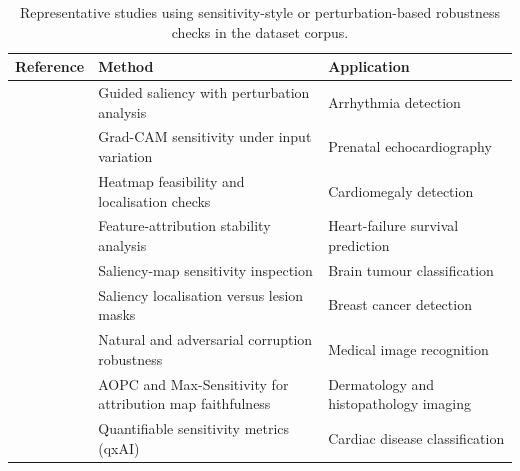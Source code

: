 \begin{table}[htbp]
\centering
\caption{Representative studies using sensitivity-style or perturbation-based robustness checks in the dataset corpus.}
\label{tab:sensitivity_methods}
\renewcommand{\arraystretch}{1.2}

\begin{tabular}{p{3cm} p{5cm} p{5cm}}
\hline
\textbf{Reference} & \textbf{Method} & \textbf{Application} \\
\hline

\cite{Zhang2021} & Guided saliency with perturbation analysis & Arrhythmia detection \\
\cite{Nurmaini2022} & Grad-CAM sensitivity under input variation & Prenatal echocardiography \\
\cite{Lee2021Cardiomegaly} & Heatmap feasibility and localisation checks & Cardiomegaly detection \\
\cite{MorenoSanchez2023} & Feature-attribution stability analysis & Heart-failure survival prediction \\
\cite{Chmiel2023} & Saliency-map sensitivity inspection & Brain tumour classification \\
\cite{Pertuz2023} & Saliency localisation versus lesion masks & Breast cancer detection \\
\cite{Repetto2025EvaluatingTR} & Natural and adversarial corruption robustness & Medical image recognition \\
\cite{Patricio2024} & AOPC and Max-Sensitivity for attribution map faithfulness & Dermatology and histopathology imaging \\
\cite{Pandey2024} & Quantifiable sensitivity metrics (qxAI) & Cardiac disease classification \\

\hline
\end{tabular}
\end{table}